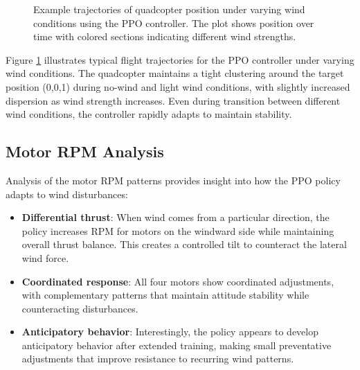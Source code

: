 \documentclass[12pt]{article}
\begin{document}
\begin{figure}[htbp]
\centering
\caption{Example trajectories of quadcopter position under varying wind conditions using the PPO controller. The plot shows position over time with colored sections indicating different wind strengths.}
\label{fig:trajectories}
\end{figure}


Figure \ref{fig:trajectories} illustrates typical flight trajectories for the PPO controller under varying wind conditions. The quadcopter maintains a tight clustering around the target position (0,0,1) during no-wind and light wind conditions, with slightly increased dispersion as wind strength increases. Even during transition between different wind conditions, the controller rapidly adapts to maintain stability.


\subsection{Motor RPM Analysis}

Analysis of the motor RPM patterns provides insight into how the PPO policy adapts to wind disturbances:


\begin{itemize}
    \item \textbf{Differential thrust}: When wind comes from a particular direction, the policy increases RPM for motors on the windward side while maintaining overall thrust balance. This creates a controlled tilt to counteract the lateral wind force.
    
    \item \textbf{Coordinated response}: All four motors show coordinated adjustments, with complementary patterns that maintain attitude stability while counteracting disturbances.
    
    \item \textbf{Anticipatory behavior}: Interestingly, the policy appears to develop anticipatory behavior after extended training, making small preventative adjustments that improve resistance to recurring wind patterns.
    
\end{itemize}
\end{document}
